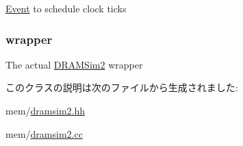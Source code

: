 \label{classDRAMSim2_acab0bec584b681055f948abbbaf8acb2}
\hyperlink{classEvent}{Event} to schedule clock ticks \hypertarget{classDRAMSim2_a19f45f63dee6f1b0a77c2758069683f8}{
\subsubsection[{wrapper}]{ {\bf wrapper}}}
\label{classDRAMSim2_a19f45f63dee6f1b0a77c2758069683f8}
The actual \hyperlink{classDRAMSim2}{DRAMSim2} wrapper 

このクラスの説明は次のファイルから生成されました:\begin{DoxyCompactItemize}
\item 
mem/\hyperlink{dramsim2_8hh}{dramsim2.hh}\item 
mem/\hyperlink{dramsim2_8cc}{dramsim2.cc}\end{DoxyCompactItemize}

